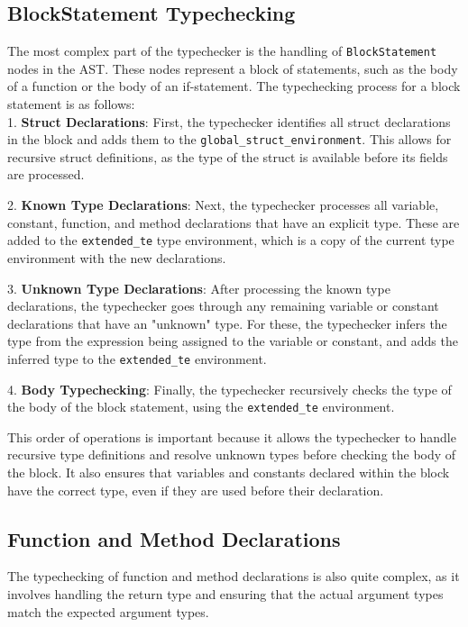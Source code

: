 \documentclass{report}
\begin{document}
\subsection{BlockStatement Typechecking}
The most complex part of the typechecker is the handling of \texttt{BlockStatement} nodes in the AST. These nodes represent a block of statements, such as the body of a function or the body of an if-statement. The typechecking process for a block statement is as follows:\\

1. \textbf{Struct Declarations}: First, the typechecker identifies all struct declarations in the block and adds them to the \texttt{global\_struct\_environment}. This allows for recursive struct definitions, as the type of the struct is available before its fields are processed.

2. \textbf{Known Type Declarations}: Next, the typechecker processes all variable, constant, function, and method declarations that have an explicit type. These are added to the \texttt{extended\_te} type environment, which is a copy of the current type environment with the new declarations.

\label{section:type-inference}
3. \textbf{Unknown Type Declarations}: After processing the known type declarations, the typechecker goes through any remaining variable or constant declarations that have an "unknown" type. For these, the typechecker infers the type from the expression being assigned to the variable or constant, and adds the inferred type to the \texttt{extended\_te} environment.

4. \textbf{Body Typechecking}: Finally, the typechecker recursively checks the type of the body of the block statement, using the \texttt{extended\_te} environment.

This order of operations is important because it allows the typechecker to handle recursive type definitions and resolve unknown types before checking the body of the block. It also ensures that variables and constants declared within the block have the correct type, even if they are used before their declaration.

\subsection{Function and Method Declarations}
The typechecking of function and method declarations is also quite complex, as it involves handling the return type and ensuring that the actual argument types match the expected argument types.
\end{document}

